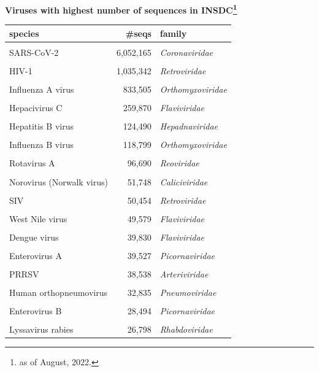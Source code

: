 \documentclass[landscape]{slides}
\begin{document}
\begin{slide}
\begin{center}

\textbf{Viruses with highest number of sequences in INSDC\footnote{as of August, 2022.}}

\tiny
\begin{tabular}{lrl}
species                   &       \#seqs & family           \\ \hline
& & \\
SARS-CoV-2                &     6,052,165& \emph{Coronaviridae}    \\ %
& & \\
HIV-1                     &     1,035,342& \emph{Retroviridae}     \\ %
& & \\
Influenza A virus         &      833,505 & \emph{Orthomyxoviridae} \\ %
& & \\
Hepacivirus C             &      259,870 & \emph{Flaviviridae}     \\ %
& & \\
Hepatitis B virus         &      124,490 & \emph{Hepadnaviridae}   \\ %
& & \\
Influenza B virus         &      118,799 & \emph{Orthomyxoviridae} \\ %
& & \\
Rotavirus A               &       96,690 & \emph{Reoviridae}       \\ %
& & \\
Norovirus (Norwalk virus) &       51,748 & \emph{Caliciviridae}    \\ %
& & \\
SIV                       &       50,454 & \emph{Retroviridae}     \\ %
& & \\
West Nile virus           &       49,579 & \emph{Flaviviridae}     \\ %
& & \\
Dengue virus              &       39,830 & \emph{Flaviviridae}     \\ %
& & \\
Enterovirus A             &       39,527 & \emph{Picornaviridae}   \\ %
& & \\
PRRSV                     &       38,538 & \emph{Arteriviridae}    \\ %
& & \\
Human orthopneumovirus    &       32,835 & \emph{Pneumoviridae}    \\ %
& & \\
Enterovirus B             &       28,494 & \emph{Picornaviridae}   \\ %
& & \\
Lyssavirus rabies         &       26,798 & \emph{Rhabdoviridae}    \\ %
\end{tabular}


\end{center}
\end{slide}
\end{document}
